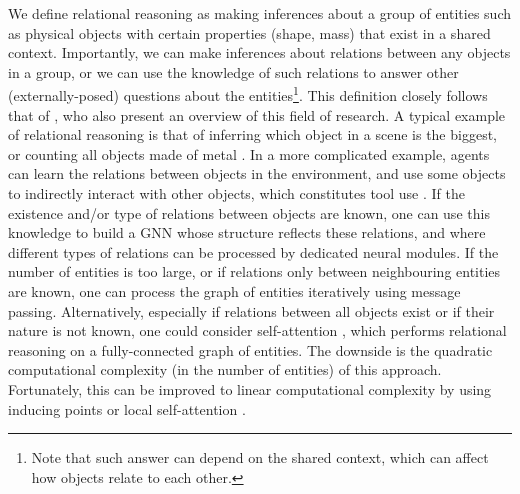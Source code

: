 	We define relational reasoning as making inferences about a group of entities such as physical objects with certain properties (\!\eg shape, mass) that exist in a shared context.
	 Importantly, we can make inferences about relations between any objects in a group, or we can use the knowledge of such relations to answer other (externally-posed) questions about the entities\footnote{Note that such answer can depend on the shared context, which can affect how objects relate to each other.}.
	 This definition closely follows that of  \cite{Battaglia2018relnets}, who also present an overview of this field of research. 
	 A typical example of relational reasoning is that of inferring which object in a scene is the biggest, or counting all objects made of metal \citep{Santoro2017}.
	 In a more complicated example, agents can learn the relations between objects in the environment, and use some objects to indirectly interact with other objects, which constitutes tool use \citep{Baker2019tooluse}.
	 If the existence and/or type of relations between objects are known, one can use this knowledge to build a \gls{GNN} \citep{Schlichtkrull2017relgraph} whose structure reflects these relations, and where different types of relations can be processed by dedicated neural modules.
	 If the number of entities is too large, or if relations only between neighbouring entities are known, one can process the graph of entities iteratively using message passing.
	 Alternatively, especially if relations between all objects exist or if their nature is not known, one could consider self-attention \citep{Vaswani17}, which performs relational reasoning on a fully-connected graph of entities.
	 The downside is the quadratic computational complexity (in the number of entities) of this approach.
	 Fortunately, this can be improved to linear computational complexity by using inducing points \citep{Lee2019set} or local self-attention \citep{Ramachandran2019standalone}.
	 
